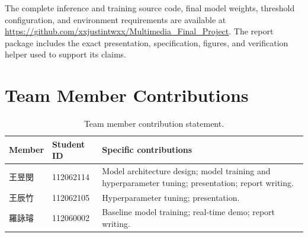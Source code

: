 \documentclass[10pt,twocolumn,a4paper]{article}
\newcommand{\ProjectRepository}{https://github.com/xxjustintwxx/Multimedia_Final_Project}
\newcommand{\MainTextEndsHere}{\label{main-text-end}\clearpage}
\begin{document}
The complete inference and training source code, final model weights, threshold
configuration, and environment requirements are available at
\url{\ProjectRepository}. The report package includes the exact presentation,
specification, figures, and verification helper used to support its claims.

\FloatBarrier

\MainTextEndsHere




\clearpage
\onecolumn
\section*{Team Member Contributions}

\begin{table}[h!]
  \centering
  \caption{Team member contribution statement.}
  \label{tab:contributions}
  \small
  \begin{tabular}{p{}p{}p{}}
    \toprule
    Member & Student ID & Specific contributions \\
    \midrule
    {\zhfont 王昱閔} & 112062114
      & Model architecture design; model training and hyperparameter tuning;
        presentation; report writing. \\
    {\zhfont 王辰竹} & 112062105
      & Hyperparameter tuning; presentation. \\
    {\zhfont 羅詠璿} & 112060002
      & Baseline model training; real-time demo; report writing. \\
    \bottomrule
  \end{tabular}
\end{table}
\end{document}
